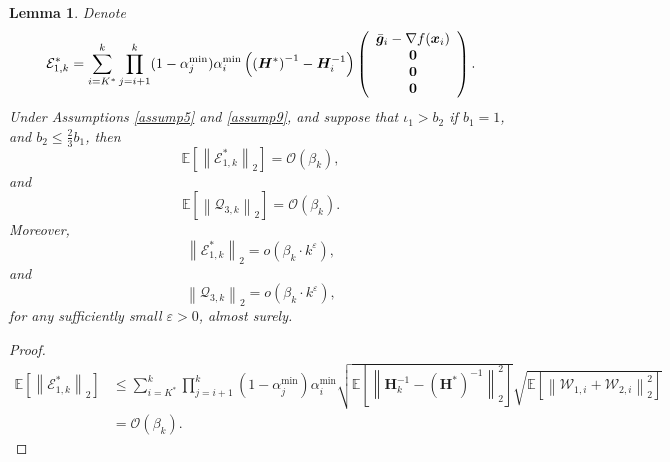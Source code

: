 \documentclass[aos]{imsart}
\numberwithin{equation}{section}
\theoremstyle{plain}
\newtheorem{lemma}{Lemma}
\begin{document}
\begin{appendix}
\begin{lemma}
\label{lemma28}
    Denote 
    \begin{equation*}
        \mathcal{E}_{1,k}^{*} = \sum_{i=K^{*}}^{k} \prod_{j=i+1}^{k} (1-\alpha^{\min}_j) \alpha^{\min}_i \left(\left(\bm{H}^{*}\right)^{-1} - \bm{H}_{i}^{-1} \right)\left( \begin{array}{c}
                \Bar{\bm{g}}_{i} - \nabla f(\bm{x}_i) \\
                \bm{0}\\
                \bm{0}\\
                \bm{0}\\
            \end{array}\right).
    \end{equation*}
    Under Assumptions \ref{assump5} and \ref{assump9}, and suppose that $\iota_1>b_2$ if $b_1=1$, and $b_2 \leq \frac{2}{3}b_1$,
    then
    \begin{equation}
        \mathbb{E} \left[ \left\|\mathcal{E}_{1,k}^{*} \right\|_2 \right] = \mathcal{O} \left( \beta_k \right),
    \end{equation}
    and
    \begin{equation}
        \mathbb{E} \left[ \left\|\mathcal{Q}_{3,k} \right\|_2 \right] = \mathcal{O} \left( \beta_k \right).
    \end{equation}
    Moreover, 
    \begin{equation*}
        \left\|\mathcal{E}_{1,k}^{*} \right\|_2 = o\left(\beta_k \cdot k^{\varepsilon}  \right),
    \end{equation*}
    and
    \begin{equation*}
        \left\|\mathcal{Q}_{3,k} \right\|_2 = o\left(\beta_k \cdot k^{\varepsilon}  \right),
    \end{equation*}
    for any sufficiently small $\varepsilon > 0$, almost surely.
    
\end{lemma}

\begin{proof}
    \begin{equation*}
        \begin{split}
            \mathbb{E} \left[ \left\|\mathcal{E}_{1,k}^{*} \right\|_2 \right]  & \leq \sum_{i=K^{*}}^{k} \prod_{j=i+1}^{k} \left( 1 - \alpha^{\min}_{j} \right) \alpha^{\min}_{i} \sqrt{\mathbb{E} \left[ \left\| \bm{H}_k^{-1} - \left(\bm{H}^{*}\right)^{-1} \right\|_2^2 \right]} \sqrt{\mathbb{E} \left[ \left\| \mathcal{W}_{1,i} + \mathcal{W}_{2,i} \right\|_2^2\right]} \\
            & = \mathcal{O} \left( \beta_k \right).
        \end{split}
    \end{equation*}



\end{proof}
\end{appendix}
\end{document}
